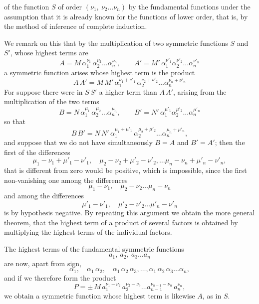 of the function $S$ of order $(\nu_1,\ \nu_2 \ldots \nu_n)$ by the
fundamental functions under the assumption that it is already known
for the functions of lower order, that is, by the method of
inference of complete induction.

We remark on this that by the multiplication of two
symmetric functions $S$ and $S'$, whose highest terms are
\[
A = M\,\alpha_1^{\nu_1}\,\alpha_2^{\nu_2} \ldots \alpha_n^{\nu_n},\qquad
A' = M'\,\alpha_1^{\nu'_1}\alpha_2^{\nu'_2} \ldots \alpha_n^{\nu'_n}
\]
a symmetric function arises whose highest term is
the product
\[
A\,A' = M\,M'\,\alpha_1^{\nu_1+\nu'_1}\,\alpha_2^{\nu_2+\nu'_2} \ldots \alpha_n^{\nu_n+\nu'_n}
\]
For suppose there were in $S\,S'$ a higher term
than $A\,A'$, arising from the multiplication of the two terms
\[
B = N\,\alpha_1^{\mu_1}\,\alpha_2^{\mu_2} \ldots \alpha_n^{\mu_n},\qquad
B' = N'\,\alpha_1^{\mu'_1}\alpha_2^{\mu'_2} \ldots \alpha_n^{\mu'_n}
\]
so that
\[
B\,B' = N\,N'\,\alpha_1^{\mu_1+\mu'_1}\,\alpha_2^{\mu_2+\mu'_2} \ldots \alpha_n^{\mu_n+\mu'_n},
\]
and suppose that we do not have simultaneously $B = A$ and $B' = A'$; then the
first of the differences
\[
\mu_1 - \nu_1 + \mu'_1 - \nu'_1,\quad \mu_2 - \nu_2 + \mu'_2 - \nu'_2, \ldots \mu_n - \nu_n + \mu'_n - \nu'_n,
\]
that is different from zero would be positive, which is impossible, since the
first non-vanishing one among the differences
\[
\mu_1 - \nu_1,\quad \mu_2 - \nu_2 \ldots \mu_n - \nu_n
\]
and among the differences
\[
\mu'_1 - \nu'_1,\quad \mu'_2 - \nu'_2 \ldots \mu'_n - \nu'_n
\]
is by hypothesis negative. By repeating this
argument we obtain the more general theorem, that the
highest term of a product of several factors is obtained
by multiplying the highest terms of the individual factors.

The highest terms of the fundamental symmetric functions
\[
a_1,\ a_2,\ a_3 \ldots a_n
\]
are now, apart from sign,
\[
\alpha_1,\quad \alpha_1\,\alpha_2,\quad \alpha_1\,\alpha_2\,\alpha_3, \ldots, \alpha_1\,\alpha_2\,\alpha_3 \ldots \alpha_n,
\]
and if we therefore form the product
\[
P = \pm\,M\,a_1^{\nu_1-\nu_2}\,a_2^{\nu_2-\nu_3} \ldots a_{n-1}^{\nu_{n-1}-\nu_n}\,a_n^{\nu_n},
\]
we obtain a symmetric function whose highest
term is likewise $A$, as in $S$.
